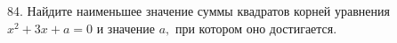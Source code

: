 84. Найдите наименьшее значение суммы квадратов корней уравнения $x^2+3x+a=0$ и значение $a,$ при котором оно достигается.\\
